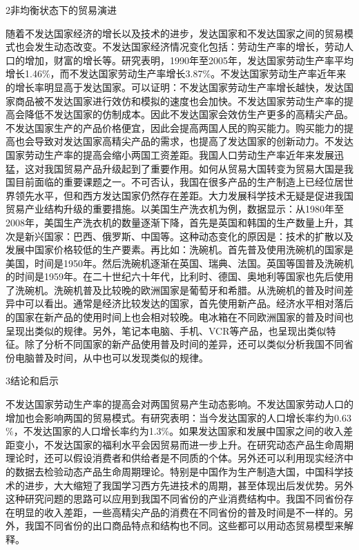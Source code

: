 2非均衡状态下的贸易演进

随着不发达国家经济的增长以及技术的进步，发达国家和不发达国家之间的贸易模式也会发生动态改变。不发达国家经济情况变化包括：劳动生产率的增长，劳动人口的增加，财富的增长等。研究表明，1990年至2005年，发达国家劳动生产率平均增长1.46$\%$，而不发达国家劳动生产率增长3.87$\%$。不发达国家劳动生产率近年来的增长率明显高于发达国家。可以证明：不发达国家劳动生产率增长越快，发达国家商品被不发达国家进行效仿和模拟的速度也会加快。不发达国家劳动生产率的提高会降低不发达国家的仿制成本。因此不发达国家会效仿生产更多的高精尖产品。不发达国家生产的产品价格便宜，因此会提高两国人民的购买能力。购买能力的提高也会导致对发达国家高精尖产品的需求，也提高了发达国家的创新动力。不发达国家劳动生产率的提高会缩小两国工资差距。我国人口劳动生产率近年来发展迅猛，这对我国贸易产品升级起到了重要作用。如何从贸易大国转变为贸易大国是我国目前面临的重要课题之一。不可否认，我国在很多产品的生产制造上已经位居世界领先水平，但和西方发达国家仍然存在差距。大力发展科学技术无疑是促进我国贸易产业结构升级的重要措施。以美国生产洗衣机为例，数据显示：从1980年至2008年，美国生产洗衣机的数量逐渐下降，首先是英国和韩国的生产数量上升，其次是新兴国家：巴西、俄罗斯、中国等。这种动态变化的原因是：技术的扩散以及发展中国家价格较低的生产要素。再比如：洗碗机。首先普及使用洗碗机的国家是美国，时间是1950年。然后洗碗机逐渐在英国、瑞典、法国。英国等国普及洗碗机的时间是1959年。在二十世纪六十年代，比利时、德国、奥地利等国家也先后使用了洗碗机。洗碗机普及比较晚的欧洲国家是葡萄牙和希腊。从洗碗机的普及时间差异中可以看出。通常是经济比较发达的国家，首先使用新产品。经济水平相对落后的国家在新产品的使用时间上也会相对较晚。电冰箱在不同欧洲国家的普及时间也呈现出类似的规律。另外，笔记本电脑、手机、VCR等产品，也呈现出类似特征。除了分析不同国家的新产品使用普及时间的差异，还可以类似分析我国不同省份电脑普及时间，从中也可以发现类似的规律。

3结论和启示

不发达国家劳动生产率的提高会对两国贸易产生动态影响。不发达国家劳动人口的增加也会影响两国的贸易模式。有研究表明：当今发达国家的人口增长率约为0.63$\%$，不发达国家的人口增长率约为1.3$\%$。如果发达国家和发展中国家之间的收入差距变小，不发达国家的福利水平会因贸易而进一步上升。在研究动态产品生命周期理论时，还可以假设消费者和供给者是不同质的个体。另外还可以利用现实经济中的数据去检验动态产品生命周期理论。特别是中国作为生产制造大国，中国科学技术的进步，大大缩短了我国学习西方先进技术的周期，甚至体现出后发优势。另外这种研究问题的思路可以应用到我国不同省份的产业消费结构中。我国不同省份存在明显的收入差距，一些高精尖产品的消费在不同省份的普及时间是不一样的。另外，我国不同省份的出口商品特点和结构也不同。这些都可以用动态贸易模型来解释。 
 